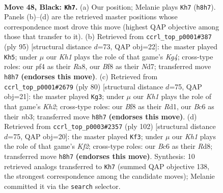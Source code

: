 \documentclass[11pt]{article}
\begin{document}
\clearpage

\begin{figure}[p]\centering
\begin{subfigure}{0.46\textwidth}\centering
\resizebox{\linewidth}{!}{%
\newchessgame
\chessboard[
  setfen={2r2bnk/p5p1/P1b5/1p3p1p/1P3P2/1R2P1PK/8/RNB5 b - - 11 48},
  showmover=false,
  pgfstyle=straightmove, color=movearrow, markmove={h8-h7}
]}
\caption{}
\end{subfigure}\hfill
\begin{subfigure}{0.46\textwidth}\centering
\resizebox{\linewidth}{!}{%
\newchessgame
\chessboard[
  setfen={r7/3n1pb1/4p3/1Np1P1k1/p1P4p/P7/KP2R1PB/8 b - - 1 48},
  showmover=false,
  pgfstyle=straightmove, color=movearrow, markmove={g5-h5}
]}
\caption{}
\end{subfigure}
\\[4pt]
\begin{subfigure}{0.46\textwidth}\centering
\resizebox{\linewidth}{!}{%
\newchessgame
\chessboard[
  setfen={5rk1/1p3p2/4r1p1/pB1p2P1/P3bB1R/1nP4P/1P5K/3R4 w - - 3 41},
  showmover=false,
  pgfstyle=straightmove, color=movearrow, markmove={h2-g3}
]}
\caption{}
\end{subfigure}\hfill
\begin{subfigure}{0.46\textwidth}\centering
\resizebox{\linewidth}{!}{%
\newchessgame
\chessboard[
  setfen={3R4/2r1p3/5kp1/2n4p/p1P2P1P/6P1/P1R1BK2/1r6 w - - 25 52},
  showmover=false,
  pgfstyle=straightmove, color=movearrow, markmove={f2-f3}
]}
\caption{}
\end{subfigure}
\caption{\textbf{Move 48, Black: \texttt{Kh7}.} (a) Our position; Melanie plays \texttt{Kh7} (\texttt{h8h7}). Panels (b)--(d) are the retrieved master positions whose correspondence most drove this move (highest QAP objective among those that transfer to it). (b) Retrieved from \texttt{ccrl\_top\_p0001\#387} (ply 95) [structural distance $d$=73, QAP obj=22]: the master played \texttt{Kh5}; under $\mu$ our \emph{Kh1} plays the role of that game's \emph{Kg4}; cross-type roles: our \emph{p}f4 as their \emph{R}a8, our \emph{B}f8 as their \emph{N}d7; transferred move \texttt{h8h7} \textbf{(endorses this move)}. (c) Retrieved from \texttt{ccrl\_top\_p0001\#2679} (ply 80) [structural distance $d$=75, QAP obj=21]: the master played \texttt{Kg3}; under $\mu$ our \emph{Kh1} plays the role of that game's \emph{Kh2}; cross-type roles: our \emph{B}f8 as their \emph{R}d1, our \emph{B}c6 as their \emph{n}b3; transferred move \texttt{h8h7} \textbf{(endorses this move)}. (d) Retrieved from \texttt{ccrl\_top\_p0003\#2357} (ply 102) [structural distance $d$=75, QAP obj=20]: the master played \texttt{Kf3}; under $\mu$ our \emph{Kh1} plays the role of that game's \emph{Kf2}; cross-type roles: our \emph{B}c6 as their \emph{R}d8; transferred move \texttt{h8h7} \textbf{(endorses this move)}. Synthesis: 10 retrieved analogs transferred to \texttt{Kh7} (summed QAP objective 138, the strongest correspondence among the candidate moves); Melanie committed it via the \texttt{search} selector.}
\label{fig:thought-m95}
\end{figure}
\end{document}
